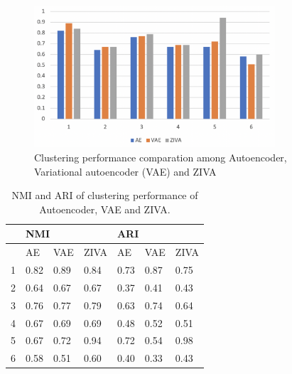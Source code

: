 \begin{figure}[htb!]
    \centering
    \includegraphics[width=0.8\textwidth]{figures/myfigures/3aeclu.png}
    \caption{Clustering performance comparation among Autoencoder, Variational autoencoder (VAE) and ZIVA}
    \label{3aeclu}
\end{figure}

\begin{table}[htb!]
\centering
\caption{NMI and ARI of clustering performance of Autoencoder, VAE and ZIVA.}
\label{t3ae}
\begin{tabular}{lllllll}
\hline
  & \multicolumn{3}{l}{NMI} & \multicolumn{3}{l}{ARI} \\ \hline
  & AE     & VAE    & ZIVA  & AE     & VAE    & ZIVA  \\ \hline
1 & 0.82   & 0.89   & 0.84  & 0.73   & 0.87   & 0.75  \\
2 & 0.64   & 0.67   & 0.67  & 0.37   & 0.41   & 0.43  \\
3 & 0.76   & 0.77   & 0.79  & 0.63   & 0.74   & 0.64  \\
4 & 0.67   & 0.69   & 0.69  & 0.48   & 0.52   & 0.51  \\
5 & 0.67   & 0.72   & 0.94  & 0.72   & 0.54   & 0.98  \\
6 & 0.58   & 0.51   & 0.60  & 0.40   & 0.33   & 0.43  \\ \hline
\end{tabular}
\end{table}

